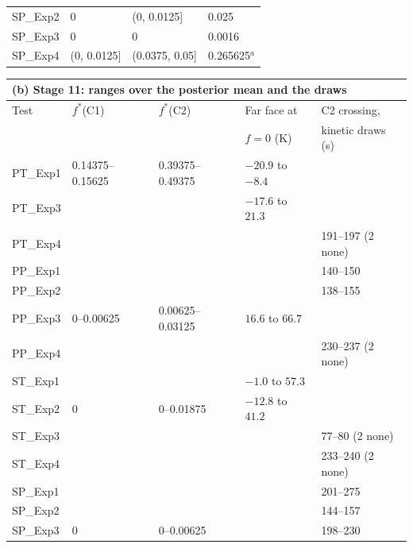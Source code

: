 \begin{table}[p]
\begin{tabular}{llll}
SP\_Exp2 & 0 & (0, 0.0125] & 0.025 \\
SP\_Exp3 & 0 & 0 & 0.0016 \\
SP\_Exp4 & (0, 0.0125] & (0.0375, 0.05] & 0.265625$^{a}$ \\
\bottomrule
\end{tabular}
\par\bigskip
\begin{tabular}{lllll}
\multicolumn{5}{l}{(b) Stage 11: ranges over the posterior mean and the draws} \\
\toprule
Test & $f^*$(C1) & $f^*$(C2) & Far face at & C2 crossing, \\
 & & & $f=0$ (K) & kinetic draws (s) \\
\midrule
PT\_Exp1 & 0.14375--0.15625 & 0.39375--0.49375 & $-20.9$ to $-8.4$ &  \\
PT\_Exp3 &  &  & $-17.6$ to $21.3$ &  \\
PT\_Exp4 &  &  &  & 191--197 (2 none) \\
PP\_Exp1 &  &  &  & 140--150 \\
PP\_Exp2 &  &  &  & 138--155 \\
PP\_Exp3 & 0--0.00625 & 0.00625--0.03125 & $16.6$ to $66.7$ &  \\
PP\_Exp4 &  &  &  & 230--237 (2 none) \\
ST\_Exp1 &  &  & $-1.0$ to $57.3$ &  \\
ST\_Exp2 & 0 & 0--0.01875 & $-12.8$ to $41.2$ &  \\
ST\_Exp3 &  &  &  & 77--80 (2 none) \\
ST\_Exp4 &  &  &  & 233--240 (2 none) \\
SP\_Exp1 &  &  &  & 201--275 \\
SP\_Exp2 &  &  &  & 144--157 \\
SP\_Exp3 & 0 & 0--0.00625 &  & 198--230 \\
\bottomrule
\end{tabular}
\end{table}

